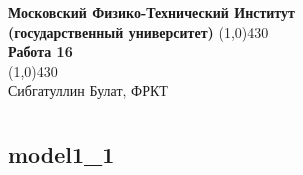 \documentclass[a4paper, 12pt]{article}%
\begin{document}
\begin{titlepage}

\begin{center}
\large\textbf{Московский Физико-Технический Институт}\\
\large\textbf{(государственный университет)}
\vfill
\line(1,0){430}\\[1mm]
\huge\textbf{Работа 16}\\
\line(1,0){430}\\[1mm]
\vfill
\large Сибгатуллин Булат, ФРКТ\\
\end{center}

\end{titlepage}

\section{}

\subsection*{\textbf{model1\_1}}
\end{document}
